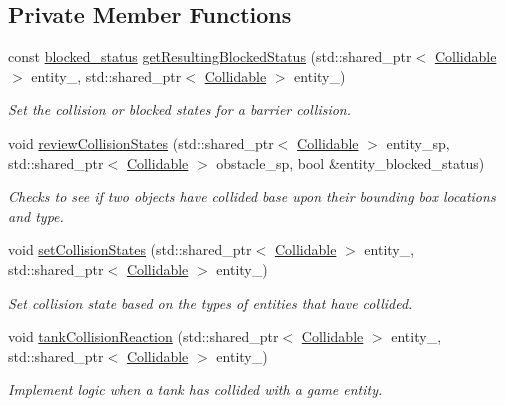 \subsection*{Private Member Functions}
\begin{DoxyCompactItemize}
\item 
const \hyperlink{Structures_8h_a6fef29d9424addfa69bdd2a379424896}{blocked\-\_\-status} \hyperlink{classCollisionManager_a9863f3588677449e9b5edd42aa5bbabd}{get\-Resulting\-Blocked\-Status} (std\-::shared\-\_\-ptr$<$ \hyperlink{classCollidable}{Collidable} $>$ entity\-\_, std\-::shared\-\_\-ptr$<$ \hyperlink{classCollidable}{Collidable} $>$ entity\-\_)
\begin{DoxyCompactList}\small\item\em Set the collision or blocked states for a barrier collision. \end{DoxyCompactList}\item 
void \hyperlink{classCollisionManager_a84a4ba8a52652b2c7164638f937243c1}{review\-Collision\-States} (std\-::shared\-\_\-ptr$<$ \hyperlink{classCollidable}{Collidable} $>$ entity\-\_\-sp, std\-::shared\-\_\-ptr$<$ \hyperlink{classCollidable}{Collidable} $>$ obstacle\-\_\-sp, bool \&entity\-\_\-blocked\-\_\-status)
\begin{DoxyCompactList}\small\item\em Checks to see if two objects have collided base upon their bounding box locations and type. \end{DoxyCompactList}\item 
void \hyperlink{classCollisionManager_a12e52b665a471debc0887deac979ca95}{set\-Collision\-States} (std\-::shared\-\_\-ptr$<$ \hyperlink{classCollidable}{Collidable} $>$ entity\-\_, std\-::shared\-\_\-ptr$<$ \hyperlink{classCollidable}{Collidable} $>$ entity\-\_)
\begin{DoxyCompactList}\small\item\em Set collision state based on the types of entities that have collided. \end{DoxyCompactList}\item 
void \hyperlink{classCollisionManager_aace76303f3c3c2097f9794e42fdbe47d}{tank\-Collision\-Reaction} (std\-::shared\-\_\-ptr$<$ \hyperlink{classCollidable}{Collidable} $>$ entity\-\_, std\-::shared\-\_\-ptr$<$ \hyperlink{classCollidable}{Collidable} $>$ entity\-\_)
\begin{DoxyCompactList}\small\item\em Implement logic when a tank has collided with a game entity. \end{DoxyCompactList}\item 

\end{DoxyCompactItemize}

